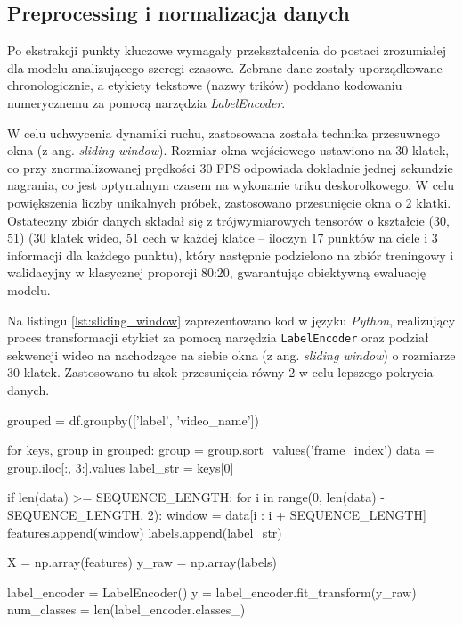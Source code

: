     \subsection{Preprocessing i normalizacja danych}
    
        Po ekstrakcji punkty kluczowe wymagały przekształcenia do postaci zrozumiałej dla modelu analizującego szeregi czasowe. Zebrane dane zostały uporządkowane chronologicznie, a etykiety tekstowe (nazwy trików) poddano kodowaniu numerycznemu za pomocą narzędzia \textit{LabelEncoder}.
        
        W celu uchwycenia dynamiki ruchu, zastosowana została technika przesuwnego okna (z ang. \textit{sliding window}). Rozmiar okna wejściowego ustawiono na 30 klatek, co przy znormalizowanej prędkości 30 FPS odpowiada dokładnie jednej sekundzie nagrania, co jest optymalnym czasem na wykonanie triku deskorolkowego. W celu powiększenia liczby unikalnych próbek, zastosowano przesunięcie okna o 2 klatki. Ostateczny zbiór danych składał się z trójwymiarowych tensorów o kształcie (30, 51) (30 klatek wideo, 51 cech w każdej klatce – iloczyn 17 punktów na ciele i 3 informacji dla każdego punktu), który następnie podzielono na zbiór treningowy i walidacyjny w klasycznej proporcji 80:20, gwarantując obiektywną ewaluację modelu. 

        Na listingu \ref{lst:sliding_window} zaprezentowano kod w języku \textit{Python}, realizujący proces transformacji etykiet za pomocą narzędzia \texttt{LabelEncoder} oraz podział sekwencji wideo na nachodzące na siebie okna (z ang. \textit{sliding window}) o rozmiarze 30 klatek. Zastosowano tu skok przesunięcia równy 2 w celu lepszego pokrycia danych.
        
        \begin{code}[
    language=Python,
    caption={Kod implementujący mechanizm przesuwnego okna oraz kodowanie etykiet.},
    label={lst:sliding_window}
]
grouped = df.groupby(['label', 'video_name'])

for keys, group in grouped:
    group = group.sort_values('frame_index')
    data = group.iloc[:, 3:].values
    label_str = keys[0]

    if len(data) >= SEQUENCE_LENGTH:
        for i in range(0, len(data) - SEQUENCE_LENGTH, 2):
            window = data[i : i + SEQUENCE_LENGTH]
            features.append(window)
            labels.append(label_str)

X = np.array(features)
y_raw = np.array(labels)

label_encoder = LabelEncoder()
y = label_encoder.fit_transform(y_raw)
num_classes = len(label_encoder.classes_)
\end{code}

